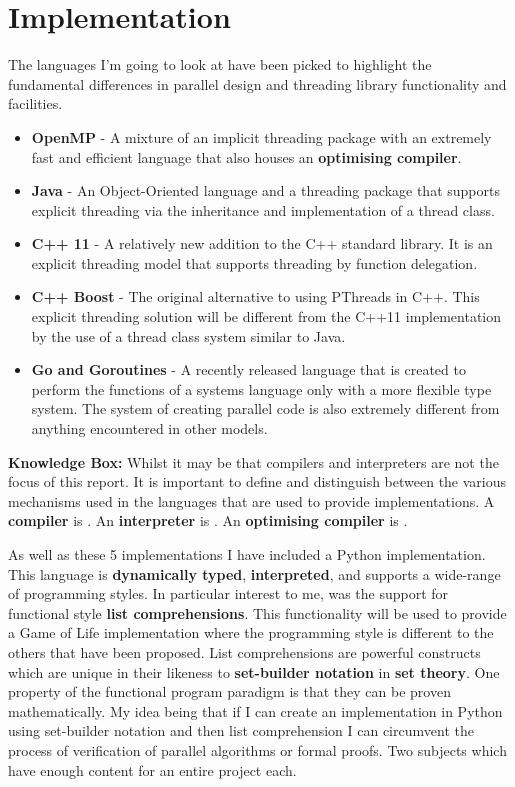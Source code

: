 \documentclass[11pt]{article} %
\begin{document}
\section{Implementation}
The languages I'm going to look at have been picked to highlight the fundamental differences in parallel design and threading library functionality and facilities. 
\begin{itemize}
\item {\bf OpenMP} - A mixture of an implicit threading package with an extremely fast and efficient language that also houses an {\bf optimising compiler}.
\item {\bf Java} - An Object-Oriented language and a threading package that supports explicit threading via the inheritance and implementation of a thread class.
\item {\bf C++ 11} - A relatively new addition to the C++ standard library. It is an explicit threading model that supports threading by function delegation.
\item {\bf C++ Boost} - The original alternative to using PThreads in C++. This explicit threading solution will be different from the C++11 implementation by the use of a thread class system similar to Java.
\item {\bf Go and Goroutines} - A recently released language that is created to perform the functions of a systems language only with a more flexible type system. The system of creating parallel code is also extremely different from anything encountered in other models.
\end{itemize}
\begin{mdframed}
{\bf Knowledge Box: } Whilst it may be that compilers and interpreters are not the focus of this report. It is important to define and distinguish between the various mechanisms used in the languages that are used to provide implementations. A {\bf compiler} is . An {\bf interpreter} is . An {\bf optimising compiler} is .
\end{mdframed}
\bigskip
As well as these 5 implementations I have included a Python implementation. This language is {\bf dynamically typed}, {\bf interpreted}, and supports a wide-range of programming styles. In particular interest to me, was the support for functional style {\bf list comprehensions}. This functionality will be used to provide a Game of Life implementation where the programming style is different to the others that have been proposed. List comprehensions are powerful constructs which are unique in their likeness to {\bf set-builder notation} in {\bf set theory}. One property of the functional program paradigm is that they can be proven mathematically. My idea being that if I can create an implementation in Python using set-builder notation and then list comprehension I can circumvent the process of verification of parallel algorithms or formal proofs. Two subjects which have enough content for an entire project each.
\end{document}
